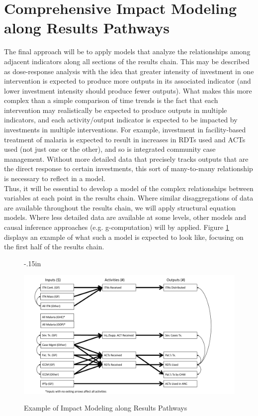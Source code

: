 \documentclass[twocolumn]{bmcart}%
\begin{document}
\section{Comprehensive Impact Modeling along Results Pathways}

The final approach will be to apply models that analyze the relationships among adjacent indicators along all sections of the results chain. This may be described as dose-response analysis with the idea that greater intensity of investment in one intervention is expected to produce more outputs in its associated indicator (and lower investment intensity should produce fewer outputs). What makes this more complex than a simple comparison of time trends is the fact that each intervention may realistically be expected to produce outputs in multiple indicators, and each activity/output indicator is expected to be impacted by investments in multiple interventions. For example, investment in facility-based treatment of malaria is expected to result in increases in RDTs used and ACTs used (not just one or the other), and so is integrated community case management. Without more detailed data that precisely tracks outputs that are the direct response to certain investments, this sort of many-to-many relationship is necessary to reflect in a model. \\

Thus, it will be essential to develop a model of the complex relationships between variables at each point in the results chain. Where similar disaggregations of data are available throughout the results chain, we will apply structural equation models. Where less detailed data are available at some levels, other models and causal inference approaches (e.g. g-computation) will by applied. Figure \ref{fig2} displays an example of what such a model is expected to look like, focusing on the first half of the results chain. \\
\begin{figure}[h]
  \advance\leftskip-.15in
  \caption{\textmd{Example of Impact Modeling along Results Pathways}}
  \includegraphics[scale=.325]{SEM_Diagram_Malaria.pdf} \\
  \label{fig2}
\end{figure}
\end{document}
